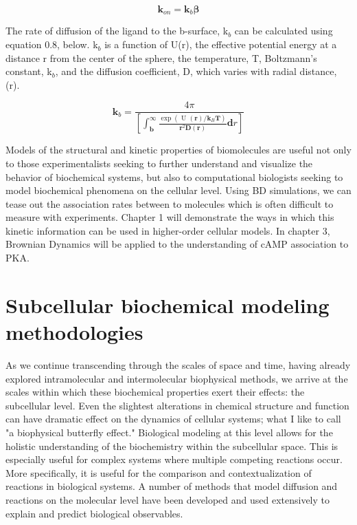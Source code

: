\documentclass[12pt]{ucsddissertation}
\begin{document}
\begin{dissertationintroduction}
\begin{equation}
    \boldsymbol { k } _ { o n } = \boldsymbol { k } _ { b } \boldsymbol { \beta }
\end{equation}

The rate of diffusion of the ligand to the b-surface, k$_{b}$ can be calculated using equation 0.8, below. k$_{b}$ is a function of  U(r), the effective potential energy at a distance r from the center of the sphere, the temperature, T, Boltzmann's constant, k$_{b}$, and the diffusion coefficient, D, which varies with radial distance, (r).

\begin{equation}
    \boldsymbol { k } _ { b } = \frac{ 4 \pi} { \left[ \int _ { \mathbf { b } } ^ { \infty } \frac { \exp \left( \text { U } ( \boldsymbol { r } ) / \boldsymbol { k } _ { B } \boldsymbol { T } \right) } { \boldsymbol { r } ^ { 2 } \boldsymbol { D } ( \boldsymbol { r } ) } \boldsymbol { d } r \right] }
\end{equation}

Models of the structural and kinetic properties of biomolecules are useful not only to those experimentalists seeking to further understand and visualize the behavior of biochemical systems, but also to computational biologists seeking to model biochemical phenomena on the cellular level. Using BD simulations, we can tease out the association rates between to molecules which is often difficult to measure with experiments. Chapter 1 will demonstrate the ways in which this kinetic information can be used in higher-order cellular models. In chapter 3, Brownian Dynamics will be applied to the understanding of cAMP association to PKA.  

\section{Subcellular biochemical modeling methodologies}
As we continue transcending through the scales of space and time, having already explored intramolecular and intermolecular biophysical methods, we arrive at the scales within which these biochemical properties exert their effects: the subcellular level. Even the slightest alterations in chemical structure and function can have dramatic effect on the dynamics of cellular systems; what I like to call "a biophysical butterfly effect." Biological modeling at this level allows for the holistic understanding of the biochemistry within the subcellular space. This is especially useful for complex systems where multiple competing reactions occur. More specifically, it is useful for the comparison and contextualization of reactions in biological systems. A number of methods that model diffusion and reactions on the molecular level have been developed and used extensively to explain and predict biological observables. %



\end{dissertationintroduction}
\end{document}
